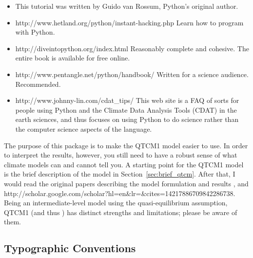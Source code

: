 \begin{itemize}
\item {}
	This tutorial was written by Guido van Rossum, Python's original
	author.

\item {}%
	{http://www.hetland.org/python/instant-hacking.php}
	Learn how to program with Python.

\item {}%
	{http://diveintopython.org/index.html}
	Reasonably complete and cohesive. The entire book is available for 
	free online.

\item {}%
	{http://www.pentangle.net/python/handbook/}
	Written for a science audience.  Recommended.

\item {}%
	{%
		{http://www.johnny-lin.com/cdat_tips/}}
	This web site is a FAQ of sorts for people using Python and
	the Climate Data Analysis Tools (CDAT) in the earth sciences,
	and thus focuses on using Python to do science rather than
	the computer science aspects of the language.

\end{itemize}

The purpose of this package is to make the QTCM1 model easier to
use.  In order to interpret the results, however, you still need
to have a robust sense of what climate models can and cannot tell
you.  A starting point for the QTCM1 model is the brief description
of the model in Section~\ref{sec:brief_qtcm}.  After that, I would
read the original papers describing the model formulation and results
\cite{Neelin/Zeng:2000,Zeng/etal:2000}, and 
%
{%
{http://scholar.google.com/scholar?hl=en&lr=&cites=14217886709842286738}.}
Being an intermediate-level model using the quasi-equilibrium assumption,
QTCM1 (and thus ) has distinct strengths and limitations; 
please be aware of them.


	\subsection{Typographic Conventions}


